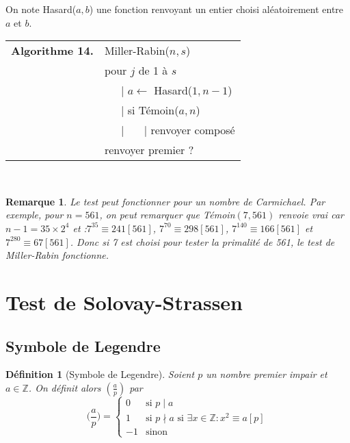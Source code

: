 \documentclass[12pt]{report}
\newtheorem*{rem}{Remarque}
\newtheorem{Def}[thm]{Définition}
\begin{document}

On note Hasard($a,b$) une fonction renvoyant un entier choisi aléatoirement entre $a$ et $b$.

\begin{tabular}{ll}
\textbf{Algorithme 14.} & Miller-Rabin($n,s$)\\
           & pour $j$ de 1 à $s$ \\
           & \ \ \ {\rm |} $a \leftarrow$ Hasard($1,n-1$) \\      
           & \ \ \ {\rm |} si Témoin($a,n$) \\
           & \ \ \ {\rm |} \ \ \ {\rm |} renvoyer composé \\
           & renvoyer premier ?
\end{tabular}\\


\begin{rem}
Le test peut fonctionner pour un nombre de Carmichael. Par exemple, pour $n=561$, on peut remarquer que Témoin$(7,561)$ renvoie vrai car $n-1=35 \times 2^4$ et :$7^{35}\equiv 241 [561]$, $7^{70}\equiv 298 [561]$, $7^{140}\equiv 166 [561]$ et $7^{280}\equiv 67 [561]$. Donc si 7 est choisi pour tester la primalité de 561, le test de Miller-Rabin fonctionne.
\end{rem}

\section{Test de Solovay-Strassen}

\subsection{Symbole de Legendre}

\begin{Def}[Symbole de Legendre]
Soient $p$ un nombre premier impair et $a \in \mathbb{Z}$. On définit alors $(\tfrac{a}{p})$ par
\begin{equation*}
\Big( \frac{a}{p} \Big)= \left \{  \begin{array}{cl}
0 & \text{si }p\mid a \\
1 & \text{si }p \nmid a \text{ si }\exists x \in \mathbb{Z}: x^2 \equiv a [p]\\
-1 & \text{sinon}
\end{array}\right.
\end{equation*}
\end{Def}
\end{document}
